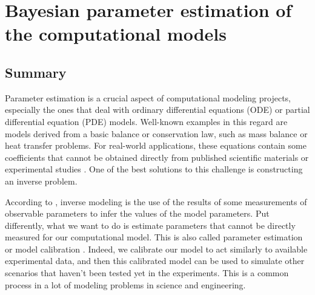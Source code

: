\chapter{Bayesian parameter estimation of the computational models}\label{ch:bayesian}

\noindent{}
\bigskip

\section{Summary}

Parameter estimation is a crucial aspect of computational modeling projects, especially the ones that deal with ordinary differential equations ({ODE}) or partial differential equation ({PDE}) models. Well-known examples in this regard are models derived from a basic balance or conservation law, such as mass balance or heat transfer problems. For real-world applications, these equations contain some coefficients that cannot be obtained directly from published scientific materials or experimental studies \cite{Dehghan2001}. One of the best solutions to this challenge is constructing an inverse problem.

According to \cite{Tarantola1987}, inverse modeling is the use of the results of some measurements of observable parameters to infer the values of the model parameters. Put differently, what we want to do is estimate parameters that cannot be directly measured for our computational model. This is also called parameter estimation or model calibration \cite{Carson2014}. Indeed, we calibrate our model to act similarly to available experimental data, and then this calibrated model can be used to simulate other scenarios that haven't been tested yet in the experiments. This is a common process in a lot of modeling problems in science and engineering.

